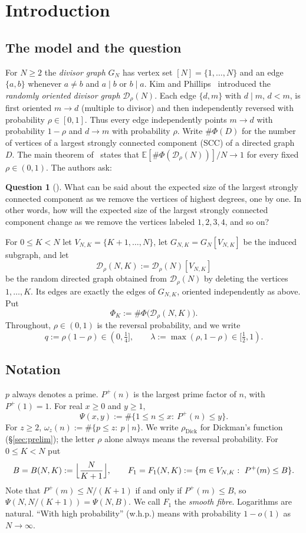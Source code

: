\documentclass[11pt]{amsart}
\theoremstyle{definition}
\newtheorem{question}[theorem]{Question}
\newcommand{\dick}{\rho_{\mathrm{Dick}}}
\newcommand{\E}{\mathbb{E}}
\newcommand{\cD}{\mathcal{D}}
\newcommand{\Pp}{P^{+}}
\begin{document}
\section{Introduction}

\subsection{The model and the question}
For $N\ge 2$ the \emph{divisor graph} $G_N$ has vertex set $[N]=\{1,\dots,N\}$ and an edge $\{a,b\}$ whenever $a\ne b$ and $a\mid b$ or $b\mid a$. Kim and Phillips~\cite{KP} introduced the \emph{randomly oriented divisor graph} $\cD_\rho(N)$. Each edge $\{d,m\}$ with $d\mid m$, $d<m$, is first oriented $m\to d$ (multiple to divisor) and then independently reversed with probability $\rho\in[0,1]$. Thus every edge independently points $m\to d$ with probability $1-\rho$ and $d\to m$ with probability $\rho$. Write $\#\Phi(D)$ for the number of vertices of a largest strongly connected component (SCC) of a directed graph $D$. The main theorem of~\cite{KP} states that $\E[\#\Phi(\cD_\rho(N))]/N\to1$ for every fixed $\rho\in(0,1)$. The authors ask:

\begin{question}[{\cite[Question~20]{KP}}]\label{q:KP}
What can be said about the expected size of the largest strongly connected component as we remove the vertices of highest degrees, one by one. In other words, how will the expected size of the largest strongly connected component change as we remove the vertices labeled $1,2,3,4$, and so on?
\end{question}

For $0\le K<N$ let $V_{N,K}=\{K+1,\dots,N\}$, let $G_{N,K}=G_N[V_{N,K}]$ be the induced subgraph, and let
\[
\cD_\rho(N,K):=\cD_\rho(N)[V_{N,K}]
\]
be the random directed graph obtained from $\cD_\rho(N)$ by deleting the vertices $1,\dots,K$. Its edges are exactly the edges of $G_{N,K}$, oriented independently as above. Put
\[
\Phi_K:=\#\Phi\bigl(\cD_\rho(N,K)\bigr).
\]
Throughout, $\rho\in(0,1)$ is the reversal probability, and we write
\[
q:=\rho(1-\rho)\in(0,\tfrac14],\qquad \lambda:=\max(\rho,1-\rho)\in[\tfrac12,1).
\]

\subsection{Notation}
$p$ always denotes a prime. $\Pp(n)$ is the largest prime factor of $n$, with $\Pp(1)=1$. For real $x\ge0$ and $y\ge1$,
\[
\Psi(x,y):=\#\{1\le n\le x:\ \Pp(n)\le y\}.
\]
For $z\ge2$, $\omega_z(n):=\#\{p\le z:\ p\mid n\}$. We write $\dick$ for Dickman's function (\S\ref{sec:prelim}); the letter $\rho$ alone always means the reversal probability. For $0\le K<N$ put
\[
B=B(N,K):=\Bigl\lfloor\frac{N}{K+1}\Bigr\rfloor,\qquad F_1=F_1(N,K):=\{m\in V_{N,K}:\ \Pp(m)\le B\}.
\]
Note that $\Pp(m)\le N/(K+1)$ if and only if $\Pp(m)\le B$, so $\Psi(N,N/(K+1))=\Psi(N,B)$. We call $F_1$ the \emph{smooth fibre}. Logarithms are natural. ``With high probability'' (w.h.p.) means with probability $1-o(1)$ as $N\to\infty$.
\end{document}
